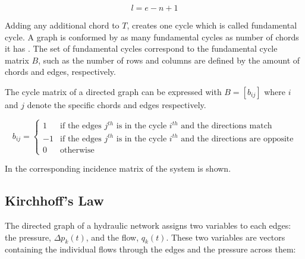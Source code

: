 \begin{equation}
  \label{Numberofchords}
  l = e - n +1
\end{equation}

Adding any additional chord to $T$, creates one cycle which is called fundamental cycle. A graph is conformed by as many fundamental cycles as number of chords it has \cite{GraphModel}.  
The set of fundamental cycles correspond to the fundamental cycle matrix $B$, such as the number of rows and columns are defined by the amount of chords and edges, respectively. 

The cycle matrix of a directed graph can be expressed with $B = [b_{ij}]$ where $i$ and $j$ denote the specific chords and 
edges respectively. 

\begin{equation}
\label{DiGraphCycle}
 b_{ij} =
		\left\{
		\begin{array}{ll}
		
		1 			&      \text{if the edges $j^{th}$ is in the cycle $i^{th}$ and the directions match}	
\\
		-1                       &     \text{if the edges $j^{th}$ is in the cycle $i^{th}$ and the directions are opposite}
\\

                0                       &      \text{otherwise}

		\end{array}
		\right.
\end{equation}	

In  the corresponding incidence matrix of the system is 
shown.

\subsection{Kirchhoff's Law}
\label{KirchhoffSection}

The directed graph of a hydraulic network assigns two variables to each edges: 
the pressure, $\Delta p_k(t)$, and the flow, $q_k(t)$. These two variables are vectors containing the individual flows through the edges and 
the pressure across them:



